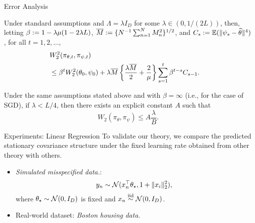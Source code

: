\documentclass[10pt,xcolor=table]{beamer}
\begin{document}
\begin{frame}{Error Analysis}
\begin{theorem} \label{thm:wasserstein-error-bound}
	Under standard assumptions and $\Lambda = \lambda I_{D}$ for some $\lambda \in (0, 1/(2L))$,
	then, letting $\beta \defas 1 - \lambda\mu \rbra*{1 - 2\lambda L}$, $\overline{M} := \{N^{-1} \sum_{n=1}^{N} M_{n}^{2}\}^{1/2}$,
	and $C_{s} :=  \mathbb{E}(\lVert\psi_{s} - \widehat{\theta}\rVert^{4})$, for all $t = 1,2,\dots$,
	\begin{equation*}
	\label{eq:wasserstein-error-bound} 
	\begin{aligned}
\lefteqn{W_{2}^{2}(\pi_{\theta,t}, \pi_{\psi,t})} \\
&\le \beta^{t}W_{2}^{2}(\theta_{0}, \psi_{0})  
+ \lambda  \overline{M} \left\lbrace \frac{\lambda  \overline{M}}{2} + \frac{2}{\mu}\right\rbrace  \sum_{s=1}^{t}\beta^{t-s}C_{s-1}. \nonumber
	\end{aligned}
	\end{equation*}
\end{theorem}
\begin{corollary} \label{cor:stationary-wasserstein-error-bound} 
	Under the same assumptions stated above and with $\beta = \infty$ (i.e., for the case of SGD), if $\lambda < L/4$, then 
	there exists an explicit constant $A$ such that 
	\[
	W_{2}(\pi_{\theta}, \pi_{\psi}) \le A\frac{\lambda}{B}.
	\]
\end{corollary}
\end{frame}

\begin{frame}{Experiments: Linear Regression}
To validate our theory, we compare the predicted stationary covariance structure under the fixed learning rate obtained from other theory with others.
\begin{itemize}
	\item \emph{Simulated misspecified data.}:
	\begin{equation*}
		\label{eq: linear regression misspecified model}
		y_{n} \sim \mathcal{N}(x_{n}^{\top}\theta_{\star}, 1+\|x_{i}\|_{2}^{2}),
	\end{equation*}
	where $\theta_{\star} \sim \mathcal{N}(0, I_{D})$ is fixed and $x_{n} \overset{\text{iid}}{\sim} \mathcal{N}(0, I_{D})$.
	\item Real-world dataset: \emph{Boston housing data.}
\end{itemize}
\end{frame}
\end{document}
